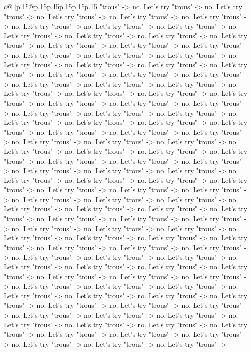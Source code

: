 \documentclass{article}
\begin{document}
{\begin{supertabular}{c@{$\;$}|p{.15\linewidth}@{}p{.15\linewidth}p{.15\linewidth}p{.15\linewidth}p{.15\linewidth}p{.15\linewidth}}
{{{"trous" {-}> no. Let's try "trous" {-}> no. Let's try "trous" {-}> no. Let's try "trous" {-}> no. Let's try "trous" {-}> no. Let's try "trous" {-}> no. Let's try "trous" {-}> no. Let's try "trous" {-}> no. Let's try "trous" {-}> no. Let's try "trous" {-}> no. Let's try "trous" {-}> no. Let's try "trous" {-}> no. Let's try "trous" {-}> no. Let's try "trous" {-}> no. Let's try "trous" {-}> no. Let's try "trous" {-}> no. Let's try "trous" {-}> no. Let's try "trous" {-}> no. Let's try "trous" {-}> no. Let's try "trous" {-}> no. Let's try "trous" {-}> no. Let's try "trous" {-}> no. Let's try "trous" {-}> no. Let's try "trous" {-}> no. Let's try "trous" {-}> no. Let's try "trous" {-}> no. Let's try "trous" {-}> no. Let's try "trous" {-}> no. Let's try "trous" {-}> no. Let's try "trous" {-}> no. Let's try "trous" {-}> no. Let's try "trous" {-}> no. Let's try "trous" {-}> no. Let's try "trous" {-}> no. Let's try "trous" {-}> no. Let's try "trous" {-}> no. Let's try "trous" {-}> no. Let's try "trous" {-}> no. Let's try "trous" {-}> no. Let's try "trous" {-}> no. Let's try "trous" {-}> no. Let's try "trous" {-}> no. Let's try "trous" {-}> no. Let's try "trous" {-}> no. Let's try "trous" {-}> no. Let's try "trous" {-}> no. Let's try "trous" {-}> no. Let's try "trous" {-}> no. Let's try "trous" {-}> no. Let's try "trous" {-}> no. Let's try "trous" {-}> no. Let's try "trous" {-}> no. Let's try "trous" {-}> no. Let's try "trous" {-}> no. Let's try "trous" {-}> no. Let's try "trous" {-}> no. Let's try "trous" {-}> no. Let's try "trous" {-}> no. Let's try "trous" {-}> no. Let's try "trous" {-}> no. Let's try "trous" {-}> no. Let's try "trous" {-}> no. Let's try "trous" {-}> no. Let's try "trous" {-}> no. Let's try "trous" {-}> no. Let's try "trous" {-}> no. Let's try "trous" {-}> no. Let's try "trous" {-}> no. Let's try "trous" {-}> no. Let's try "trous" {-}> no. Let's try "trous" {-}> no. Let's try "trous" {-}> no. Let's try "trous" {-}> no. Let's try "trous" {-}> no. Let's try "trous" {-}> no. Let's try "trous" {-}> no. Let's try "trous" {-}> no. Let's try "trous" {-}> no. Let's try "trous" {-}> no. Let's try "trous" {-}> no. Let's try "trous" {-}> no. Let's try "trous" {-}> no. Let's try "trous" {-}> no. Let's try "trous" {-}> no. Let's try "trous" {-}> no. Let's try "trous" {-}> no. Let's try "trous" {-}> no. Let's try "trous" {-}> no. Let's try "trous" {-}> no. Let's try "trous" {-}> no. Let's try "trous" {-}> no. Let's try "trous" {-}> no. Let's try "trous" {-}> no. Let's try "trous" {-}> no. Let's try "trous" {-}> no. Let's try "trous" {-}> no. Let's try "trous" {-}> no. Let's try "trous" {-}> no. Let's try "trous" {-}> no. Let's try "trous" {-}> no. Let's try "trous" {-}> no. Let's try "trous" {-}> no. Let's try "trous" {-}> no. Let's try "trous" {-}> no. Let's try "trous" {-}> no. Let's try "trous" {-}> no. Let's try "trous" {-}> no. Let's try "trous" {-}> no. Let's try "trous" {-}> no. Let's try "trous" {-}> no. Let's try "trous" {-}> no. Let's try "trous" {-}> no. Let's try "trous" {-}> no. Let's try "trous" {-}> no. Let's try "trous" {-}> no. Let's try "trous" {-}> no. Let's try "trous" {-}> no. Let's try "trous" {-}> no. Let's try "trous" {-}> }}}
\end{supertabular}}
\end{document}
